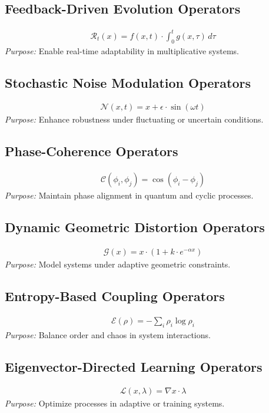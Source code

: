 \documentclass{article}
\theoremstyle{plain}
\begin{document}
\begin{itemize}
\subsection{Feedback-Driven Evolution Operators}
    \begin{align}
        \mathcal{R}_t(x) = f(x, t) \cdot \int_0^t g(x, \tau) \, d\tau
    \end{align}
    \textit{Purpose:} Enable real-time adaptability in multiplicative systems.

\subsection{Stochastic Noise Modulation Operators}
    \begin{align}
        \mathcal{N}(x, t) = x + \epsilon \cdot \sin(\omega t)
    \end{align}
    \textit{Purpose:} Enhance robustness under fluctuating or uncertain conditions.

\subsection{Phase-Coherence Operators}
    \begin{align}
        \mathcal{C}(\phi_i, \phi_j) = \cos(\phi_i - \phi_j)
    \end{align}
    \textit{Purpose:} Maintain phase alignment in quantum and cyclic processes.

\subsection{Dynamic Geometric Distortion Operators}
    \begin{align}
        \mathcal{G}(x) = x \cdot (1 + k \cdot e^{-\alpha x})
    \end{align}
    \textit{Purpose:} Model systems under adaptive geometric constraints.

\subsection{Entropy-Based Coupling Operators}
    \begin{align}
        \mathcal{E}(\rho) = -\sum_{i} \rho_i \log \rho_i
    \end{align}
    \textit{Purpose:} Balance order and chaos in system interactions.

\subsection{Eigenvector-Directed Learning Operators}
    \begin{align}
        \mathcal{L}(x, \lambda) = \nabla x \cdot \lambda
    \end{align}
    \textit{Purpose:} Optimize processes in adaptive or training systems.


\end{itemize}
\end{document}
